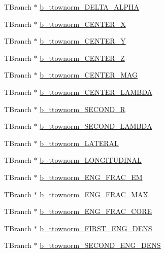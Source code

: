 \begin{DoxyCompactItemize}
T\+Branch $\ast$ \hyperlink{classXMLWriter_a794ff1cbe7d443b3182ee0611d976881}{b\+\_\+ttownorm\+\_\+\+D\+E\+L\+T\+A\+\_\+\+A\+L\+P\+HA}
\item 
T\+Branch $\ast$ \hyperlink{classXMLWriter_a19a8abb628d61a8e9099a0e37f8f9c4c}{b\+\_\+ttownorm\+\_\+\+C\+E\+N\+T\+E\+R\+\_\+X}
\item 
T\+Branch $\ast$ \hyperlink{classXMLWriter_a027fb2ca77b3e398534969d5f273e8d0}{b\+\_\+ttownorm\+\_\+\+C\+E\+N\+T\+E\+R\+\_\+Y}
\item 
T\+Branch $\ast$ \hyperlink{classXMLWriter_a4e740f7adc52439d303bc6a67489f566}{b\+\_\+ttownorm\+\_\+\+C\+E\+N\+T\+E\+R\+\_\+Z}
\item 
T\+Branch $\ast$ \hyperlink{classXMLWriter_a9b84663995e69f060d9ac3a5cc57ab43}{b\+\_\+ttownorm\+\_\+\+C\+E\+N\+T\+E\+R\+\_\+\+M\+AG}
\item 
T\+Branch $\ast$ \hyperlink{classXMLWriter_a980a7454578885346def39bad55413aa}{b\+\_\+ttownorm\+\_\+\+C\+E\+N\+T\+E\+R\+\_\+\+L\+A\+M\+B\+DA}
\item 
T\+Branch $\ast$ \hyperlink{classXMLWriter_aafc8140a7305fab6f659c17797c036a6}{b\+\_\+ttownorm\+\_\+\+S\+E\+C\+O\+N\+D\+\_\+R}
\item 
T\+Branch $\ast$ \hyperlink{classXMLWriter_adfa19506047948c4a74387212914f41b}{b\+\_\+ttownorm\+\_\+\+S\+E\+C\+O\+N\+D\+\_\+\+L\+A\+M\+B\+DA}
\item 
T\+Branch $\ast$ \hyperlink{classXMLWriter_ac684ffc43ec8035023bfca75a6188489}{b\+\_\+ttownorm\+\_\+\+L\+A\+T\+E\+R\+AL}
\item 
T\+Branch $\ast$ \hyperlink{classXMLWriter_a34d1de77be8c01d75564c923aaf61de2}{b\+\_\+ttownorm\+\_\+\+L\+O\+N\+G\+I\+T\+U\+D\+I\+N\+AL}
\item 
T\+Branch $\ast$ \hyperlink{classXMLWriter_a92b477ce3f61eabf825f6aabbdeca152}{b\+\_\+ttownorm\+\_\+\+E\+N\+G\+\_\+\+F\+R\+A\+C\+\_\+\+EM}
\item 
T\+Branch $\ast$ \hyperlink{classXMLWriter_a7daecfa1a5948ee134a33ef458155d7a}{b\+\_\+ttownorm\+\_\+\+E\+N\+G\+\_\+\+F\+R\+A\+C\+\_\+\+M\+AX}
\item 
T\+Branch $\ast$ \hyperlink{classXMLWriter_a0a3cc4481709a617c6773e126ec3440a}{b\+\_\+ttownorm\+\_\+\+E\+N\+G\+\_\+\+F\+R\+A\+C\+\_\+\+C\+O\+RE}
\item 
T\+Branch $\ast$ \hyperlink{classXMLWriter_ac85f43a0b9b57b67853be080a4170a5d}{b\+\_\+ttownorm\+\_\+\+F\+I\+R\+S\+T\+\_\+\+E\+N\+G\+\_\+\+D\+E\+NS}
\item 
T\+Branch $\ast$ \hyperlink{classXMLWriter_ae015165bfc435f6223f8aff7e7d2960a}{b\+\_\+ttownorm\+\_\+\+S\+E\+C\+O\+N\+D\+\_\+\+E\+N\+G\+\_\+\+D\+E\+NS}

\end{DoxyCompactItemize}
